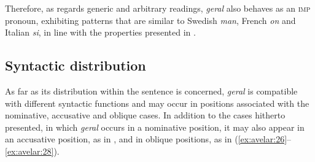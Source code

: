\documentclass[output=paper]{langscibook}
\begin{document}
{Therefore, as regards generic and arbitrary readings,} \textit{geral} {also behaves as an \textsc{imp} pronoun, exhibiting patterns that are similar to Swedish} {\textit{man}}{, French} {\textit{on} }{and Italian} {\textit{si}}{, in line with the properties presented in \citet{Egerland2003}.}

\subsection{Syntactic distribution}\label{sec:avelar:4.3}

As far as its distribution within the sentence is concerned, \textit{geral} {is compatible with different syntactic functions and may occur in positions associated with the nominative, accusative and oblique cases. In addition to the cases hitherto presented, in which} \textit{geral} occurs in a nominative position, it may also appear in an accusative position, as in , and in oblique positions, as in (\ref{ex:avelar:26}--\ref{ex:avelar:28}).
\end{document}
